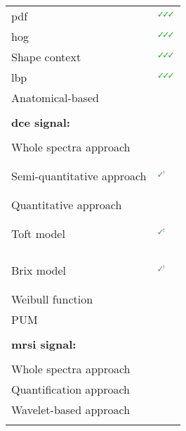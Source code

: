 \begin{table*}
\begin{threeparttable}
\begin{tabular}{p{.5\linewidth} p{.4\linewidth}}
      \quad \quad \quad \acs{pdf} & $^{\text{{\cmarksmall}{\cmarksmall}{\cmarksmall}}}$\cite{Liu2013} \\
      \quad \quad \quad \acs{hog} & $^{\text{{\cmarksmall}{\cmarksmall}{\cmarksmall}}}$\cite{Liu2013} \\
      \quad \quad \quad Shape context & $^{\text{{\cmarksmall}{\cmarksmall}{\cmarksmall}}}$\cite{Liu2013} \\
      \quad \quad \quad \acs{lbp} & $^{\text{{\cmarksmall}{\cmarksmall}{\cmarksmall}}}$\cite{Liu2013} \\
      \quad \quad Anatomical-based & \cite{Litjens2012,Litjens2014,Lv2009} \\ \\ [-1.5ex]
      \textbf{\ac{dce} signal:} & \\ \\ [-1.5ex]
      \quad Whole spectra approach & \cite{Ampeliotis2007,Ampeliotis2008} \\
      \quad Semi-quantitative approach & $^{\text{{\mmarksmall}}}$\cite{Puech2009}\par \cite{Mazzetti2011,Niaf2011,Niaf2012,Sung2011} \\
      \quad Quantitative approach &  \\
      \quad \quad Toft model & $^{\text{{\mmarksmall}}}$\cite{Liu2013,Puech2009}\par \cite{Giannini2013,Langer2009,Litjens2011,Litjens2012,Litjens2014,Mazzetti2011,Niaf2011,Niaf2012} \\
      \quad \quad Brix model & $^{\text{{\mmarksmall}}}$\cite{Artan2009,Artan2010,Ozer2009,Ozer2010}\par \cite{Liu2009,Sung2011} \\
      \quad \quad Weibull function & \cite{Giannini2013,Mazzetti2011} \\
      \quad \quad PUM & \cite{Giannini2013,Mazzetti2011} \\
      \\ [-1.5ex]
      \textbf{\ac{mrsi} signal:} & \\ \\ [-1.5ex]
      \quad Whole spectra approach & \cite{Kelm2007,Matulewicz2013,Parfait2012,Tiwari2007,Tiwari2008,Tiwari2009,Tiwari2009a,Tiwari2010,Tiwari2013,Viswanath2008} \\
      \quad Quantification approach & \cite{Kelm2007,Parfait2012} \\
      \quad Wavelet-based approach & \cite{Tiwari2012} \\ \\ [-1.5ex]

\end{tabular}
\end{threeparttable}
\end{table*}
